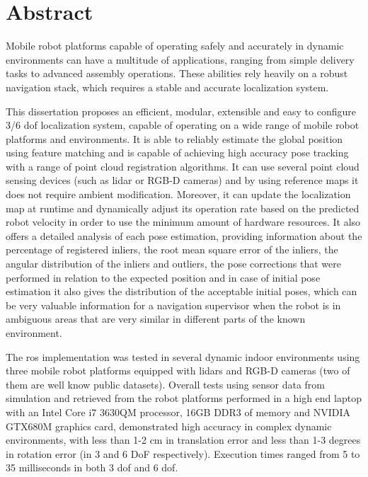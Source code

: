 \chapter*{Abstract}

Mobile robot platforms capable of operating safely and accurately in dynamic environments can have a multitude of applications, ranging from simple delivery tasks to advanced assembly operations. These abilities rely heavily on a robust navigation stack, which requires a stable and accurate localization system.

This dissertation proposes an efficient, modular, extensible and easy to configure 3/6 \gls{dof} localization system, capable of operating on a wide range of mobile robot platforms and environments. It is able to reliably estimate the global position using feature matching and is capable of achieving high accuracy pose tracking with a range of point cloud registration algorithms. It can use several point cloud sensing devices (such as \gls{lidar} or RGB-D cameras) and by using reference maps it does not require ambient modification. Moreover, it can update the localization map at runtime and dynamically adjust its operation rate based on the predicted robot velocity in order to use the minimum amount of hardware resources. It also offers a detailed analysis of each pose estimation, providing information about the percentage of registered inliers, the root mean square error of the inliers, the angular distribution of the inliers and outliers, the pose corrections that were performed in relation to the expected position and in case of initial pose estimation it also gives the distribution of the acceptable initial poses, which can be very valuable information for a navigation supervisor when the robot is in ambiguous areas that are very similar in different parts of the known environment.

The \gls{ros} implementation was tested in several dynamic indoor environments using three mobile robot platforms equipped with \glspl{lidar} and RGB-D cameras (two of them are well know public datasets). Overall tests using sensor data from simulation and retrieved from the robot platforms performed in a high end laptop with an Intel Core i7 3630QM processor, 16GB DDR3 of memory and NVIDIA GTX680M graphics card, demonstrated high accuracy in complex dynamic environments, with less than 1-2 cm in translation error and less than 1-3 degrees in rotation error (in 3 and 6 DoF respectively). Execution times ranged from 5 to 35 milliseconds in both 3 \gls{dof} and 6 \gls{dof}.

